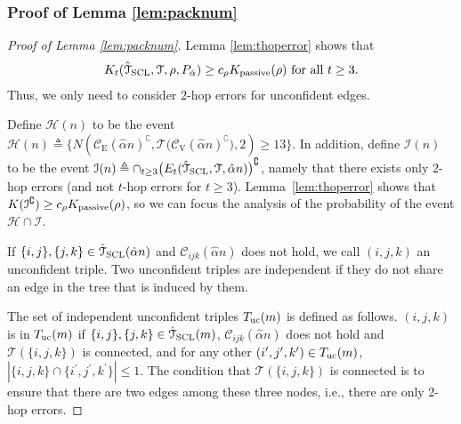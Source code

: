 \documentclass[11pt,onecolumn]{article}
\newcommand{\calC}{\mathcal{C}}
\newcommand{\calH}{\mathcal{H}}
\newcommand{\calI}{\mathcal{I}}
\newcommand{\calT}{\mathcal{T}}
\newcommand{\hatcalT}{\hat{\calT}}
\newcommand{\scC}{\mathscr{C}}
\newcommand{\halpha}{\hat{\alpha}}
\newcommand{\Passive}{{\rm passive}}
\begin{document}
\subsubsection{Proof of Lemma \ref{lem:packnum}}
\begin{proof}[Proof of Lemma \ref{lem:packnum}]
    Lemma \ref{lem:thoperror} shows that 
    \begin{align}
    	K _{t}(\hatcalT_{{\rm SCL}},\calT,\rho,P_{\halpha})\geq c_{\rho}K _{\Passive}(\rho) \text{ for all }t\geq 3.
    \end{align}
    Thus, we only need to consider  $2$-hop errors for unconfident edges.

	Define $\calH(n)$ to be the event $\calH(n)\triangleq \{N(\scC_{\mathrm{E}}(\halpha n)^{\complement},\calT\big(\scC_{\mathrm{V}}(\halpha n)^{\complement}\big),2)\geq 13\}$. In addition, define $\calI(n)$ to be the event $\calI(n)\triangleq\cap_{t\geq 3}\big(E_{t}(\hatcalT_{{\rm SCL}},\calT,\halpha n)\big)^{\complement}$, namely that there  exists only $2$-hop errors (and not $t$-hop errors for $t\ge 3$). 
	Lemma~\ref{lem:thoperror} shows that $K (\calI^{\complement})\geq c_{\rho}K _{\Passive}(\rho)$, so we can focus the analysis  of the probability of the event $\calH\cap \calI$. 
	
	If $\{i,j\},\{j,k\}\in \hatcalT_{{\rm SCL}}(\halpha n)$ and $\calC_{ijk}(\halpha n)$ does not hold, we call $(i,j,k)$ an unconfident triple. Two unconfident triples are independent if they do not  share an edge in the tree that is induced by them. %
	
	The set of independent unconfident triples $T_{{\rm uc}}(m)$ is defined as follows. $(i,j,k)$ is in $T_{{\rm uc}}(m)$ if $\{i,j\},\{j,k\}\in \hatcalT_{{\rm SCL}}(m)$, $\calC_{ijk}(\halpha n)$ does not hold and $\calT(\{i,j,k\})$ is connected, and for any other
	$(i^{\prime},j^{\prime},k^{\prime}) \in T_{{\rm uc}}(m)$, $|\{i,j,k\}\cap\{i^{\prime},j^{\prime},k^{\prime}\}|\leq 1$. The condition that $\calT(\{i,j,k\})$ is connected is to ensure that there are two edges among these three nodes, i.e., there 
	are only 2-hop errors.
	

\end{proof}
\end{document}
